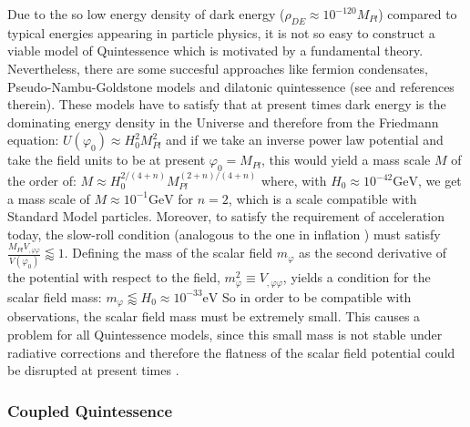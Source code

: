 Due to the so low energy density of dark energy ($\rho_{DE} \approx 10 ^{-120} M_{Pl}$)
compared to typical energies appearing in particle physics, it is not so easy to construct a 
viable model of Quintessence which is motivated by a fundamental theory. Nevertheless, there are 
some succesful approaches like fermion condensates, Pseudo-Nambu-Goldstone models and 
dilatonic quintessence (see \cite{amendola_dark_2010} and references therein).
These models have to satisfy that at present times dark energy is the dominating 
energy density in the Universe and therefore from the Friedmann equation:
\beeqc$
U(\varphi_0) \approx H_0^2 M_{Pl}^2
$
and if we take an inverse power law potential and take the field units to be at present $\varphi_0 = M_{Pl}$,
this would yield a mass scale $M$ of the order
of:
\beeqc$
M \approx H_0^{2/(4+n)} M_{Pl}^{(2+n)/(4+n)}
$
where, with $H_0 \approx 10^{-42} \mathrm{GeV} $, we get a mass scale of $M \approx 10^{-1} \mathrm{GeV}$
for $n=2$, which is a scale compatible with Standard Model particles.
Moreover, to satisfy the requirement of acceleration today, 
the slow-roll condition (analogous to the one in inflation \cite{infl}) must satisfy 
$ \frac{M_{Pl} V_{,\varphi \varphi}}{V(\varphi_0)} \lessapprox 1$.
Defining the mass of the scalar field $m_\varphi$ as the second derivative of the potential with respect to the field,
$m^2_\varphi \equiv  V_{,\varphi \varphi} $, yields a condition for the scalar field mass:
\beeqp$
m_\varphi \lessapprox H_0 \approx 10^{-33} \mathrm{eV}
$
So in order to be compatible with observations, 
the scalar field mass must be extremely small.
This causes a problem for all Quintessence models,
since this small mass is not stable under radiative corrections
and therefore the flatness of the scalar field potential could
be disrupted at present times \cite{Kolda, Lyth}.

\subsubsection{Coupled Quintessence}


